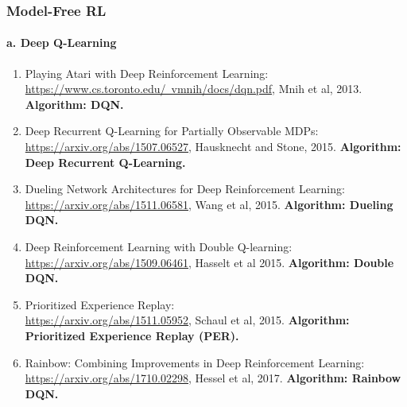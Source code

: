 \documentclass[lang=cn,11pt,a4paper]{elegant_template}
\begin{document}
\subsubsection{Model-Free RL} 
\paragraph{a. Deep Q-Learning}
\begin{enumerate}
    \item Playing Atari with Deep Reinforcement Learning:\\ \href{https://www.cs.toronto.edu/~vmnih/docs/dqn.pdf}{https://www.cs.toronto.edu/~vmnih/docs/dqn.pdf}, Mnih et al, 2013. \textbf{Algorithm: DQN.}
    \item Deep Recurrent Q-Learning for Partially Observable MDPs:\\ \href{https://arxiv.org/abs/1507.06527}{https://arxiv.org/abs/1507.06527}, Hausknecht and Stone, 2015. \textbf{Algorithm: Deep Recurrent Q-Learning.}
    \item Dueling Network Architectures for Deep Reinforcement Learning:\\ \href{https://arxiv.org/abs/1511.06581}{https://arxiv.org/abs/1511.06581}, Wang et al, 2015. \textbf{Algorithm: Dueling DQN.}
    \item Deep Reinforcement Learning with Double Q-learning:\\ \href{https://arxiv.org/abs/1509.06461}{https://arxiv.org/abs/1509.06461}, Hasselt et al 2015. \textbf{Algorithm: Double DQN.}
    \item Prioritized Experience Replay:\\ \href{https://arxiv.org/abs/1511.05952}{https://arxiv.org/abs/1511.05952}, Schaul et al, 2015. \textbf{Algorithm: Prioritized Experience Replay (PER).}
    \item Rainbow: Combining Improvements in Deep Reinforcement Learning:\\ \href{https://arxiv.org/abs/1710.02298}{https://arxiv.org/abs/1710.02298}, Hessel et al, 2017. \textbf{Algorithm: Rainbow DQN.}
\end{enumerate}
\end{document}
